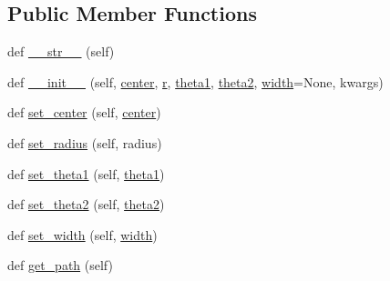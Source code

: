 \subsection*{Public Member Functions}
\begin{DoxyCompactItemize}
\item 
def \hyperlink{classmatplotlib_1_1patches_1_1Wedge_a5ceb65a1a53602e83b3619914e82311c}{\+\_\+\+\_\+str\+\_\+\+\_\+} (self)
\item 
def \hyperlink{classmatplotlib_1_1patches_1_1Wedge_aa196212402ad24ade5bf7071712dd07a}{\+\_\+\+\_\+init\+\_\+\+\_\+} (self, \hyperlink{classmatplotlib_1_1patches_1_1Wedge_ad2d8888221ba8446bdc7ffa01c411b31}{center}, \hyperlink{classmatplotlib_1_1patches_1_1Wedge_a16c2f1788c90fcb7af34155e2c92a351}{r}, \hyperlink{classmatplotlib_1_1patches_1_1Wedge_a2c8dbb7f5d533fe98c390b45ed7b262c}{theta1}, \hyperlink{classmatplotlib_1_1patches_1_1Wedge_a3c4f354bb134e360bff5aa2f31541f55}{theta2}, \hyperlink{classmatplotlib_1_1patches_1_1Wedge_af925ee3ece47ca8b5df17769462d67fd}{width}=None, kwargs)
\item 
def \hyperlink{classmatplotlib_1_1patches_1_1Wedge_afbc5e75bc2669e0b61d3d373b4c25d99}{set\+\_\+center} (self, \hyperlink{classmatplotlib_1_1patches_1_1Wedge_ad2d8888221ba8446bdc7ffa01c411b31}{center})
\item 
def \hyperlink{classmatplotlib_1_1patches_1_1Wedge_a0b2b552e378b083062134a38652531a7}{set\+\_\+radius} (self, radius)
\item 
def \hyperlink{classmatplotlib_1_1patches_1_1Wedge_acf93997b9fe9005d2a8c17b2eabad234}{set\+\_\+theta1} (self, \hyperlink{classmatplotlib_1_1patches_1_1Wedge_a2c8dbb7f5d533fe98c390b45ed7b262c}{theta1})
\item 
def \hyperlink{classmatplotlib_1_1patches_1_1Wedge_aa732d9d8dca6f844508a3fee283fe97c}{set\+\_\+theta2} (self, \hyperlink{classmatplotlib_1_1patches_1_1Wedge_a3c4f354bb134e360bff5aa2f31541f55}{theta2})
\item 
def \hyperlink{classmatplotlib_1_1patches_1_1Wedge_a48bba41d848ea62033f48cb79e5eef60}{set\+\_\+width} (self, \hyperlink{classmatplotlib_1_1patches_1_1Wedge_af925ee3ece47ca8b5df17769462d67fd}{width})
\item 
def \hyperlink{classmatplotlib_1_1patches_1_1Wedge_ad7521a9e78b636dd38e4cbbaee38945c}{get\+\_\+path} (self)
\end{DoxyCompactItemize}

